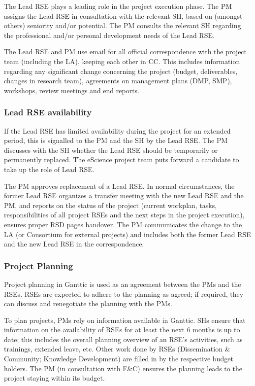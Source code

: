\documentclass[11pt]{article}
\begin{document}
The Lead RSE plays a leading role in the project execution phase. The PM assigns the Lead RSE in consultation with the
relevant SH, based on (amongst others) seniority and/or potential. The PM consults the relevant SH regarding the
professional and/or personal development needs of the Lead RSE.

The Lead RSE and PM use email for all official correspondence with the project team (including the LA), keeping each
other in CC. This includes information regarding any significant change concerning the project (budget, deliverables,
changes in research team), agreements on management plans (DMP, SMP), workshops, review meetings and end reports.

\subsubsection{Lead RSE availability}
If the Lead RSE has limited availability during the project for an extended period, this is signalled to the PM and the
SH by the Lead RSE. The PM discusses with the SH whether the Lead RSE should be temporarily or permanently replaced.
The eScience project team puts forward a candidate to take up the role of Lead RSE.

The PM approves replacement of a Lead RSE. In normal circumstances, the former Lead RSE organizes a transfer meeting
with the new Lead RSE and the PM, and reports on the status of the project (current workplan, tasks, responsibilities
of all project RSEs and the next steps in the project execution), ensures proper RSD pages handover. The PM
communicates the change to the LA (or Consortium for external projects) and includes both the former Lead RSE and the
new Lead RSE in the correspondence.

\subsubsection{Project Planning}

Project planning in Ganttic is used as an agreement between the PMs and the RSEs. RSEs are expected to adhere to the
planning as agreed; if required, they can discuss and renegotiate the planning with the PMs.

To plan projects, PMs rely on information available in Ganttic. SHs ensure that information on the availability of RSEs
for at least the next 6 months is up to date; this includes the overall planning overview of an
RSE's activities, such as trainings, extended leave, etc. Other work done by RSEs (Dissemination
\& Community; Knowledge Development) are filled in by the respective budget holders. The PM (in consultation with F\&C)
ensures the planning leads to the project staying within its budget.
\end{document}
